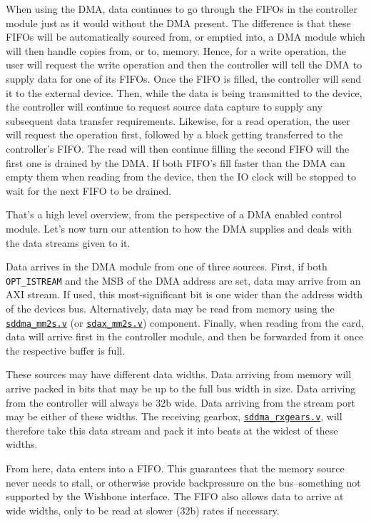\documentclass{gqtekspec}
\newcommand{\zhref}[2]{\href{#1}{\textcolor{dkblue}{#2}}}
\begin{document}
When using the DMA, data continues to go through the FIFOs in the controller
module just as it would without the DMA present.  The difference is that these
FIFOs will be automatically sourced from, or emptied into, a DMA module which
will then handle copies
from, or to, memory.  Hence, for a write operation, the user will request
the write operation and then the controller will tell the DMA to supply data
for one of its FIFOs.  Once the FIFO is filled, the controller will send it
to the external device.  Then, while the data is being transmitted to the
device, the controller will continue to request source data capture to supply
any subsequent data transfer requirements.  Likewise, for a read operation,
the user will request the operation first, followed by a block getting
transferred to the controller's FIFO.  The read will then continue filling
the second FIFO will the first one is drained by the DMA.  If both FIFO's
fill faster than the DMA can empty them when reading from the device, then
the IO clock will be stopped to wait for the next FIFO to be drained.

That's a high level overview, from the perspective of a DMA enabled control
module.  Let's now turn our attention to how the DMA supplies and deals
with the data streams given to it.

Data arrives in the DMA module from one of three sources.  First, if both
{\tt OPT\_ISTREAM} and the MSB of the DMA address are set, data may arrive from
an AXI stream.  If used, this most-significant bit is one wider than the
address width of the devices bus.  Alternatively, data may be read from memory
using the \zhref{../rtl/sddma\_mm2s.v}{\tt sddma\_mm2s.v} (or
\zhref{../rtl/sdio/sdax\_mm2s.v}{\tt sdax\_mm2s.v}) component.  Finally, when reading
from the card, data will arrive first in the controller module, and then be
forwarded from it once the respective buffer is full.

These sources may have different data widths.  Data arriving from memory will
arrive packed in bits that may be up to the full bus width in size.  Data
arriving from the controller will always be 32b wide.  Data arriving from the
stream port may be either of these widths.  The receiving gearbox,
\zhref{../rtl/sddma\_rxgears.v}{\tt sddma\_rxgears.v}, will therefore take this
data stream and pack it into beats at the widest of these widths.

From here, data enters into a FIFO.  This guarantees that the memory source
never needs to stall, or otherwise provide backpressure on the bus--something
not supported by the Wishbone interface.  The FIFO also allows data to arrive
at wide widths, only to be read at slower (32b) rates if necessary.
\end{document}
